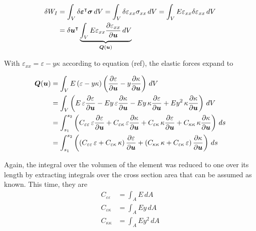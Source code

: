 \begin{align}
\delta W_{I} &= \int_{V} \delta\boldsymbol{\varepsilon}^\intercal\boldsymbol{\sigma}\,dV = \int_{V} \delta\varepsilon_{xx}\sigma_{xx}\,dV = \int_{V} E\varepsilon_{xx}\delta\varepsilon_{xx}\,dV \notag \\
&= \delta\boldsymbol{u}^\intercal \underbrace{\int_{V} E\varepsilon_{xx}\frac{\partial\varepsilon_{xx}}{\partial\boldsymbol{u}}\,dV}_{\boldsymbol{Q}(\boldsymbol{u})}
\end{align}

With $\varepsilon_{xx} = \varepsilon - y\kappa$ according to equation (ref), the elastic forces expand to

\begin{align}
\boldsymbol{Q}(\boldsymbol{u}) &= \int_{V} E\left(\varepsilon - y\kappa\right)\left(\frac{\partial\varepsilon}{\partial\boldsymbol{u}} - y\frac{\partial\kappa}{\partial\boldsymbol{u}}\right)\,dV \notag \\
&= \int_{V}\left(E\,\varepsilon\frac{\partial\varepsilon}{\partial\boldsymbol{u}} - Ey\,\varepsilon\frac{\partial\kappa}{\partial\boldsymbol{u}} - Ey\,\kappa\frac{\partial\varepsilon}{\partial\boldsymbol{u}} + Ey^2\,\kappa\frac{\partial\kappa}{\partial\boldsymbol{u}}\right)\,dV \notag \\
&= \int_{s_1}^{s_2}\left(C_{\varepsilon\varepsilon}\,\varepsilon\frac{\partial\varepsilon}{\partial\boldsymbol{u}} + C_{\varepsilon\kappa}\,\varepsilon\frac{\partial\kappa}{\partial\boldsymbol{u}} + C_{\varepsilon\kappa}\,\kappa\frac{\partial\varepsilon}{\partial\boldsymbol{u}} + C_{\kappa\kappa}\,\kappa\frac{\partial\kappa}{\partial\boldsymbol{u}}\right)\,ds \notag \\
&= \int_{s_1}^{s_2}\left(\left(C_{\varepsilon\varepsilon}\,\varepsilon + C_{\varepsilon\kappa}\,\kappa\right)\frac{\partial\varepsilon}{\partial\boldsymbol{u}} + \left(C_{\kappa\kappa}\,\kappa + C_{\varepsilon\kappa}\,\varepsilon\right)\frac{\partial\kappa}{\partial\boldsymbol{u}}\right)\,ds
\end{align}

Again, the integral over the volumen of the element was reduced to one over its length by extracting integrals over the cross section area that can be assumed as known.
This time, they are
%
\begin{align}
C_{\varepsilon\varepsilon} &= \int_{A} E\,dA \\
C_{\varepsilon\kappa} &= \int_{A} Ey\,dA \\
C_{\kappa\kappa} &= \int_{A} Ey^2\,dA
\end{align}

